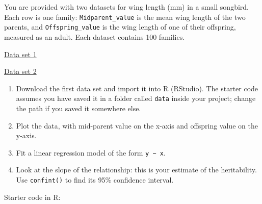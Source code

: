 \documentclass[
  a4paper]{book}
\newenvironment{Shaded}{\begin{snugshade}}{\end{snugshade}}
\newcommand{\AttributeTok}[1]{\textcolor[rgb]{0.13,0.29,0.53}{#1}}
\newcommand{\CommentTok}[1]{\textcolor[rgb]{0.56,0.35,0.01}{\textit{#1}}}
\newcommand{\DecValTok}[1]{\textcolor[rgb]{0.00,0.00,0.81}{#1}}
\newcommand{\FunctionTok}[1]{\textcolor[rgb]{0.13,0.29,0.53}{\textbf{#1}}}
\newcommand{\NormalTok}[1]{#1}
\newcommand{\OtherTok}[1]{\textcolor[rgb]{0.56,0.35,0.01}{#1}}
\newcommand{\SpecialCharTok}[1]{\textcolor[rgb]{0.81,0.36,0.00}{\textbf{#1}}}
\newcommand{\StringTok}[1]{\textcolor[rgb]{0.31,0.60,0.02}{#1}}
\providecommand{\tightlist}{%
  \setlength{\itemsep}{0pt}\setlength{\parskip}{0pt}}
\begin{document}
You are provided with two datasets for wing length (mm) in a small songbird. Each row is one family: \texttt{Midparent\_value} is the mean wing length of the two parents, and \texttt{Offspring\_value} is the wing length of one of their offspring, measured as an adult. Each dataset contains 100 families.

\href{https://www.dropbox.com/scl/fi/8oe1can46pshxojw1p29m/heritability_pop1.csv?rlkey=ssg6ymzr85gkrzw9e1y63ghzu&dl=0}{Data set 1}

\href{https://www.dropbox.com/scl/fi/yoy0x7kczvlr1eku5057m/heritability_pop2.csv?rlkey=30hta1di8v6w93ghbhq09dlbm&dl=0}{Data set 2}

\begin{enumerate}
\def\labelenumi{\arabic{enumi})}
\tightlist
\item
  Download the first data set and import it into R (RStudio). The starter code assumes you have saved it in a folder called \texttt{data} inside your project; change the path if you saved it somewhere else.
\item
  Plot the data, with mid-parent value on the x-axis and offspring value on the y-axis.
\item
  Fit a linear regression model of the form \texttt{y\ \textasciitilde{}\ x}.
\item
  Look at the slope of the relationship: this is your estimate of the heritability. Use \texttt{confint()} to find its 95\% confidence interval.
\end{enumerate}

Starter code in R:

\begin{Shaded}
\end{Shaded}
\end{document}
